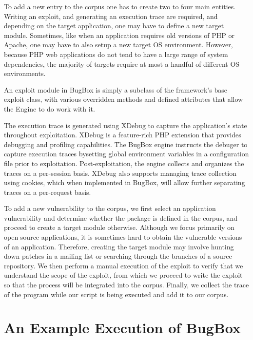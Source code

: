 \documentclass[letterpaper,twocolumn,10pt]{article}
\begin{document}
To add a new entry to the corpus one has to create two to four main entities. Writing an exploit, and generating an execution trace are required, and depending on the target application, one may have to define a new target module. Sometimes, like when an application requires old versions of PHP or Apache, one may have to also setup a new target OS environment. However, because PHP web applications do not tend to have a large range of system dependencies, the majority of targets require at most a handful of different OS environments. \par

An exploit module in BugBox is simply a subclass of the framework's base exploit class, with various overridden methods and defined attributes that allow the Engine to do work with it.

The execution trace is generated using XDebug to capture the application's state throughout exploitation. XDebug is a feature-rich PHP extension that provides debugging and profiling capabilities. The BugBox engine instructs the debuger to capture execution traces bysetting global environment variables in a configuration file prior to exploitation. Post-exploitation, the engine collects and organizes the traces on a per-session basis. XDebug also supports managing trace collection using cookies, which when implemented in BugBox, will allow further separating traces on a per-request basis.  \par

To add a new vulnerability to the corpus, we first select an application vulnerability and determine whether the package is defined in the corpus, and proceed to create a target module otherwise. Although we focus primarily on open source applications, it is sometimes hard to obtain the vulnerable versions of an application. Therefore, creating the target module may involve hunting down patches in a mailing list or searching through the branches of a source repository. We then perform a manual execution of the exploit to verify that we understand the scope of the exploit, from which we proceed to write the exploit so that the process will be integrated into the corpus. Finally, we collect the trace of the program while our script is being executed and add it to our corpus.\par


\section {An Example Execution of BugBox}
\end{document}
